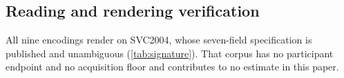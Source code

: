 


\subsection{Reading and rendering verification}
\label{sec:results-svc}

All nine encodings render on SVC2004, whose seven-field specification is published and unambiguous
(\cref{tab:signature}). That corpus has no participant endpoint and no acquisition floor and
contributes to no estimate in this paper.


